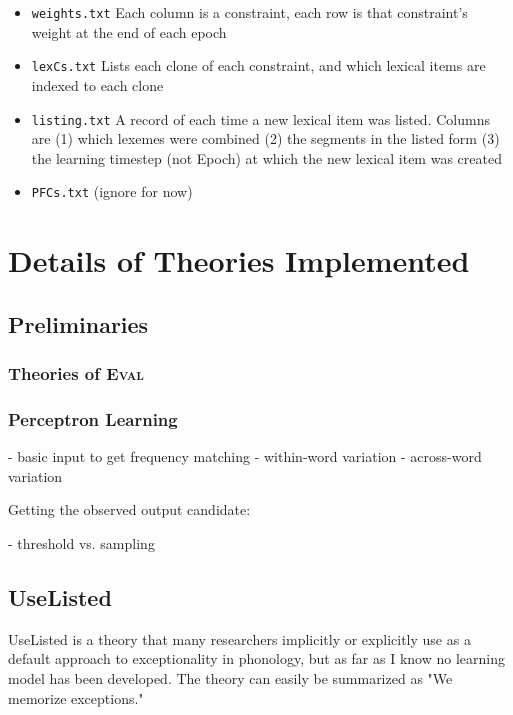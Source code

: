 \documentclass[12]{article}
\begin{document}
\begin{itemize}
	\item \texttt{weights.txt} Each column is a constraint, each row is that constraint's weight at the end of each epoch
	\item \texttt{lexCs.txt} Lists each clone of each constraint, and which lexical items are indexed to each clone
	\item \texttt{listing.txt} A record of each time a new lexical item was listed.  Columns are (1) which lexemes were combined (2) the segments in the listed form (3) the learning timestep (not Epoch) at which the new lexical item was created
	\item \texttt{PFCs.txt} (ignore for now)

\end{itemize}




\section{Details of Theories Implemented}
	\subsection{Preliminaries}
		\subsubsection{Theories of \textsc{Eval}}

		\subsubsection{Perceptron Learning}
		
		- basic input to get frequency matching
			- within-word variation
			- across-word variation
		
		
		Getting the observed output candidate:
		
		- threshold vs. sampling
		
		
	\subsection{UseListed}
		UseListed is a theory that many researchers implicitly or explicitly use as a default approach to exceptionality in phonology, but as far as I know no learning model has been developed.  The theory can easily be summarized as "We memorize exceptions."
		
\end{document}
